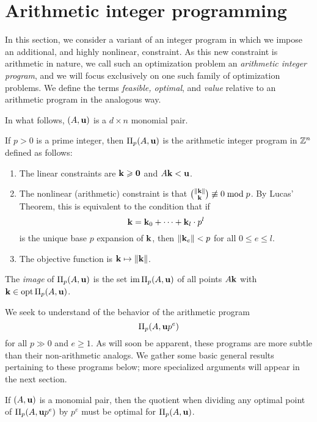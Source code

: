 \documentclass[11pt]{amsart}
\renewcommand{\!}[1]{{\color{red}\text{$\star$\,}#1\,$\star$}}
\begin{document}
\newpage
\section{Arithmetic integer programming}

In this section, we consider a variant of an integer program in which we impose an additional, and {highly} nonlinear, constraint.  As this new constraint is arithmetic in nature, we call such an optimization problem an \emph{arithmetic integer program}, and we will focus exclusively on one such family of optimization problems.  We define the terms \emph{feasible, optimal}, and \emph{value} relative to an arithmetic program in the analogous way.   

In what follows, $(A, \mathbf{u})$ is a $d \times n$ monomial pair.


\begin{definition} If $p>0$ is a prime integer, then $\Pi_p(A, \mathbf{u})$ is the arithmetic integer program in $\mathbb{Z}^n$ defined as follows:
\begin{enumerate}
\item The linear constraints are $\mathbf{k} \geqslant \mathbf{0}$ and $A \mathbf{k} < \mathbf{u}$.  
\item The nonlinear (arithmetic) constraint is that $\binom{\| \mathbf{k} \|}{\mathbf{k}} \not \equiv 0 \bmod p$.  By Lucas' Theorem, this is equivalent to the condition that  if \[ \mathbf{k} = \mathbf{k}_0 + \cdots + \mathbf{k}_l \cdot  p^l\] is the unique base $p$ expansion of $\mathbf{k}$, then $\| \mathbf{k}_e \| < p$ for all $0 \leq e \leq l $.
\item The objective function is $\mathbf{k} \mapsto \| \mathbf{k} \|$.
\end{enumerate}

\end{definition}

\begin{definition}
The \emph{image} of $\Pi_p(A, \mathbf{u})$ is the set $\operatorname{im} \Pi_p(A, \mathbf{u})$ of all points  $A \mathbf{k}$ with $\mathbf{k} \in \operatorname{opt} \Pi_p(A, \mathbf{u})$. 
\end{definition}

We seek to understand of the behavior of the arithmetic program \[ \Pi_p(A, \mathbf{u}p^e)\] for all $p \gg 0$ and $e \geq 1$.    As will soon be apparent, these programs are more subtle than their non-arithmetic analogs.  We gather some basic general results pertaining to these programs below;  more specialized arguments will appear in the next section.

\begin{lemma} 
\label{optimal division: L}  If $(A, \mathbf{u})$ is a monomial pair, then the quotient when dividing any optimal point of $\Pi_p(A, \mathbf{u}p^e)$ by $p^e$ must be optimal for $\Pi_p(A, \mathbf{u})$.
\end{lemma}
\end{document}
